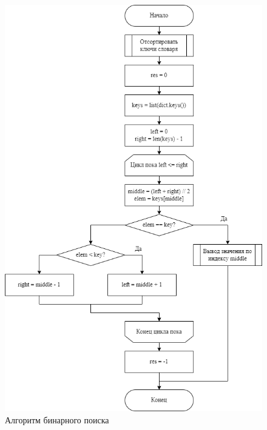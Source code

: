 \begin{figure}[h!btp]
	\centering
	\includegraphics[width=380pt]{inc/bin_search.png}
	\caption{Алгоритм бинарного поиска}
	\label{fig:bin-search}	
\end{figure}

\clearpage

